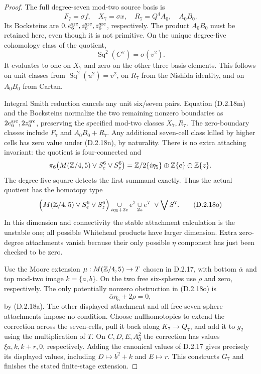 \begin{proof}
The full degree-seven mod-two source basis is
\[
 F_7=\sigma f,\quad X_7=\sigma x,\quad
 R_7=Q^4A_0,\quad A_0B_0.
\]
Its Bocksteins are $0,e_6^{\rm src},z_6^{\rm src},
z_6^{\rm src}$, respectively. The product $A_0B_0$
must be retained here, even though it is not primitive.
On the unique degree-five cohomology class of the quotient,
\[
 \operatorname{Sq}^2(C^\vee)=\sigma(v^2).
 \tag{D.2.18n}
\]
It evaluates to one on $X_7$ and zero on the other three
basis elements. This follows on unit classes from
$\operatorname{Sq}^2(u^2)=v^2$, on $R_7$ from the
Nishida identity, and on $A_0B_0$ from Cartan.

Integral Smith reduction cancels any unit six/seven pairs.
Equation \textup{(D.2.18m)} and the Bocksteins normalize the
two remaining nonzero boundaries as
$2e_6^{\rm src},2z_6^{\rm src}$, preserving the specified
mod-two classes $X_7,R_7$. The zero-boundary classes include
$F_7$ and $A_0B_0+R_7$. Any additional seven-cell class
killed by higher cells has zero value under
\textup{(D.2.18n)}, by naturality.
There is no extra attaching invariant: the quotient is
four-connected and
\[
 \pi_6\bigl(M(\mathbb Z/4,5)\vee S^6_e\vee S^6_z\bigr)
 =\mathbb Z/2\{i\eta_5\}\oplus\mathbb Z\{e\}\oplus\mathbb Z\{z\}.
\]
The degree-five square detects the first summand exactly.
Thus the actual quotient has the homotopy type
\[
 \Bigl(M(\mathbb Z/4,5)\vee S^6_e\vee S^6_z\Bigr)
 \mathop{\cup}_{i\eta_5+2e}e^7
 \mathop{\cup}_{2z}e^7
 \ \vee\bigvee S^7.
 \tag{D.2.18o}
\]
In this dimension and connectivity the stable attachment
calculation is the unstable one; all possible Whitehead
products have larger dimension. Extra zero-degree
attachments vanish because their only possible $\eta$
component has just been checked to be zero.

Use the Moore extension
$\mu:M(\mathbb Z/4,5)\to T$ chosen in D.2.17, with bottom
$\overline\alpha$ and top mod-two image $k=\{a,b\}$.
On the two free six-spheres use $\rho$ and zero,
respectively. The only potentially nonzero obstruction
in \textup{(D.2.18o)} is
\[
 \overline\alpha\eta_5+2\rho=0,
 \tag{D.2.18p}
\]
by \textup{(D.2.18a)}. The other displayed attachment and
all free seven-sphere attachments impose no condition.
Choose nullhomotopies to extend the correction across the
seven-cells, pull it back along $K_7\to Q_7$, and add it
to $g_2$ using the multiplication of $T$.
On $C,D,E,A_0^2$ the correction has values
$\xi a,k,k+r,0$, respectively. Adding the canonical
values of D.2.17 gives precisely its displayed values,
including $D\mapsto b^2+k$ and $E\mapsto r$.
This constructs $G_7$ and finishes the stated finite-stage
extension.
\end{proof}
